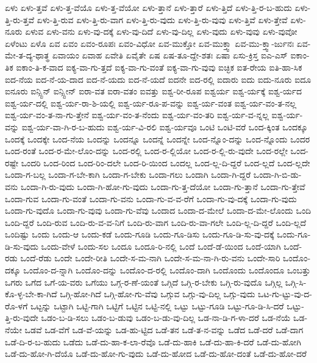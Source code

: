 {ಏಳು
ಏಳು-ತ್ತವೆ
ಏಳು-ತ್ತ-ವೆಯೊ
ಏಳು-ತ್ತ-ವೆಯೋ
ಏಳು-ತ್ತಾನೆ
ಏಳು-ತ್ತಾರೆ
ಏಳು-ತ್ತಿದೆ
ಏಳು-ತ್ತಿ-ರ-ಬ-ಹುದು
ಏಳು-ತ್ತಿ-ರು-ತ್ತವೆ
ಏಳು-ತ್ತಿ-ರುವ
ಏಳು-ತ್ತಿ-ರು-ವಾಗ
ಏಳು-ತ್ತಿ-ರು-ವುದು
ಏಳು-ತ್ತಿ-ರು-ವುವು
ಏಳು-ತ್ತಿವೆ
ಏಳು-ತ್ತೇವೆ
ಏಳು-ನೂರು
ಏಳುವ
ಏಳು-ವನು
ಏಳು-ವು-ದಕ್ಕೆ
ಏಳು-ವು-ದಿದೆ
ಏಳು-ವು-ದಿಲ್ಲ
ಏಳು-ವುದು
ಏಳು-ವುವು
ಏಳು-ವುವೋ
ಏಳೆಂಟು
ಏಳೊ
ಏವ
ಏವಂ
ಏವಂ-ರೂಪಃ
ಏವಂ-ವಿಧೋ
ಏವ-ಮುಕ್ತೋ
ಏವ-ಮುಕ್ತ್ವಾ
ಏವ-ಮು-ಕ್ತ್ವಾ-ರ್ಜುನಃ
ಏವ-ಮೇ-ತ-ದ್ಯ-ಥಾತ್ಥ
ಏವಾಯಂ
ಏವಾಹ
ಏವೇತಿ
ಏವೈತೇ
ಏಷ
ಏಷ-ತೂ-ದ್ದೇ-ಶತಃ
ಏಷಾ
ಏಸು-ಕ್ರಿಸ್ತ
ಐಎ-ಎಸ್
ಐಕಾಂ-ತಿಕ
ಐಕಾಂ-ತಿ-ಕ-ವಾದ
ಐಕ್ಯ-ವಾ-ಗು-ತ್ತದೆ
ಐಕ್ಯ-ವಾ-ಗು-ವಂತೆ
ಐಕ್ಯ-ವಾ-ಗು-ವುವು
ಐಚ್ಛಿಕ
ಐತ-ರೇಯ
ಐತಿ-ಹಾ-ಸಿಕ
ಐದ-ನೆಯ
ಐದ-ನೆ-ಯ-ದಾದ
ಐದ-ನೆ-ಯದು
ಐದ-ನೆ-ಯದೆ
ಐದನೇ
ಐದ-ರಲ್ಲಿ
ಐದಾರು
ಐದು
ಐದು-ನೂರು
ಐದೂ
ಐನೂರು
ಐನ್ಸ್ಟಿನ್
ಐನ್ಸ್ಟೀನ್
ಐರಾ-ವತ
ಐರಾ-ವತಂ
ಐವತ್ತು
ಐಶ್ವ-ರೀ-ರೂಪ
ಐಶ್ವರ್ಯ
ಐಶ್ವ-ರ್ಯಕ್ಕೆ
ಐಶ್ವ-ರ್ಯದ
ಐಶ್ವ-ರ್ಯ-ದಲ್ಲಿ
ಐಶ್ವ-ರ್ಯ-ರಾ-ಶಿ-ಯಲ್ಲಿ
ಐಶ್ವ-ರ್ಯ-ರೂ-ಪ-ವನ್ನು
ಐಶ್ವ-ರ್ಯ-ವಂತ
ಐಶ್ವ-ರ್ಯ-ವಂ-ತ-ನಲ್ಲ
ಐಶ್ವ-ರ್ಯ-ವಂ-ತ-ನಾ-ಗು-ತ್ತೇನೆ
ಐಶ್ವ-ರ್ಯ-ವಂ-ತ-ನೆಂದು
ಐಶ್ವ-ರ್ಯ-ವಂ-ತರಿ
ಐಶ್ವ-ರ್ಯ-ವ-ನ್ನಲ್ಲ
ಐಶ್ವ-ರ್ಯ-ವನ್ನು
ಐಶ್ವ-ರ್ಯ-ವಾ-ಗಿ-ರ-ಬ-ಹುದು
ಐಶ್ವ-ರ್ಯ-ವಿ-ರಲಿ
ಐಶ್ವ-ರ್ಯವೂ
ಒಂಟಿ
ಒಂಟಿ-ವರೆ
ಒಂದ-ಕ್ಕಿಂತ
ಒಂದಕ್ಕೂ
ಒಂದಕ್ಕೆ
ಒಂದಕ್ಕೇ
ಒಂದ-ನೆಯ
ಒಂದನ್ನು
ಒಂದನ್ನೂ
ಒಂದನ್ನೆ
ಒಂದನ್ನೇ
ಒಂದ-ನ್ನೊಂ-ದನ್ನು
ಒಂದ-ನ್ನೊಂದು
ಒಂದರ
ಒಂದ-ರಂತೆ
ಒಂದ-ರ-ಮೇ-ಲೊಂ-ದನ್ನು
ಒಂದ-ರಲ್ಲಿ
ಒಂದ-ರ-ಲ್ಲಿಯೋ
ಒಂದ-ರ-ಲ್ಲಿ-ರು-ವುದೇ
ಒಂದ-ರಲ್ಲೇ
ಒಂದ-ರಷ್ಟೇ
ಒಂದರಿ
ಒಂದ-ರಿಂದ
ಒಂದ-ರಿಂ-ದಲೇ
ಒಂದ-ರಿ-ಯಿಂದ
ಒಂದಲ್ಲ
ಒಂದ-ಲ್ಲ-ದಿ-ದ್ದರೆ
ಒಂದ-ಲ್ಲದೆ
ಒಂದ-ಲ್ಲದೇ
ಒಂದಾ-ಗ-ಬಲ್ಲ
ಒಂದಾ-ಗ-ಬೇ-ಕಾಗಿ
ಒಂದಾ-ಗ-ಬೇಕು
ಒಂದಾ-ಗಲು
ಒಂದಾಗಿ
ಒಂದಾ-ಗಿ-ದ್ದರೆ
ಒಂದಾ-ಗಿ-ಬಿ-ಡು-ವನು
ಒಂದಾ-ಗಿ-ರು-ವುದು
ಒಂದಾ-ಗಿ-ಹೋ-ಗು-ವುದು
ಒಂದಾ-ಗು-ತ್ತ-ದೆಯೋ
ಒಂದಾ-ಗು-ತ್ತಾನೆ
ಒಂದಾ-ಗು-ತ್ತೇವೆ
ಒಂದಾ-ಗುವ
ಒಂದಾ-ಗು-ವಂತೆ
ಒಂದಾ-ಗು-ವನು
ಒಂದಾ-ಗು-ವ-ವ-ರೆಗೆ
ಒಂದಾ-ಗು-ವು-ದಕ್ಕೆ
ಒಂದಾ-ಗು-ವುದು
ಒಂದಾ-ಗು-ವುದೊ
ಒಂದಾ-ಗು-ವುವು
ಒಂದಾ-ಗು-ವೆವು
ಒಂದಾದ
ಒಂದಾ-ದ-ಮೇಲೆ
ಒಂದಾ-ದ-ಮೇ-ಲೊಂದು
ಒಂದಿ
ಒಂದಿ-ದ್ದರೆ
ಒಂದಿ-ರುವ
ಒಂದಿ-ರು-ವ-ವ-ನಿಗೆ
ಒಂದಿ-ರು-ವಾಗ
ಒಂದಿ-ರು-ವಾ-ಗಲೇ
ಒಂದಿ-ಲ್ಲ-ದಿ-ದ್ದರೆ
ಒಂದಿ-ಲ್ಲದೆ
ಒಂದಿಷ್ಟು
ಒಂದು
ಒಂದು-ಆ
ಒಂದು-ಕಡೆ
ಒಂದು-ಗೂಡಿ
ಒಂದು-ಗೂ-ಡಿಸು
ಒಂದು-ಗೂ-ಡಿ-ಸು-ವು-ದಕ್ಕೆ
ಒಂದು-ಗೂ-ಡಿ-ಸು-ವುದು
ಒಂದು-ವೇಳೆ
ಒಂದು-ಸಲ
ಒಂದೂ
ಒಂದೂ-ರಿ-ನಲ್ಲಿ
ಒಂದೆ
ಒಂದೆ-ಡೆ-ಯಿಂದ
ಒಂದೆ-ಯಾಗಿ
ಒಂದೆ-ರಡು
ಒಂದೆ-ರೆಡು
ಒಂದೇ
ಒಂದೇ-ರೀತಿ
ಒಂದೇ-ಸ-ಮ-ನಾಗಿ
ಒಂದೇ-ಸ-ಮ-ನಾ-ಗಿ-ರು-ವನು
ಒಂದೇ-ಸಾರಿ
ಒಂದೊಂ-ದಕ್ಕೂ
ಒಂದೊಂ-ದ-ನ್ನಾಗಿ
ಒಂದೊಂ-ದನ್ನು
ಒಂದೊಂ-ದ-ರಲ್ಲಿ
ಒಂದೊಂ-ದಾಗಿ
ಒಂದೊಂದು
ಒಂದೊಂದೂ
ಒಂಬತ್ತು
ಒಗರು
ಒಗೆದ
ಒಗೆ-ಯ-ವರು
ಒಗೆಯು
ಒಗ್ಗ-ರ-ಣೆ-ಯಂತೆ
ಒಗ್ಗಿದೆ
ಒಗ್ಗಿ-ರ-ಬೇಕು
ಒಗ್ಗಿ-ರು-ವುದೊ
ಒಗ್ಗಿಲ್ಲ
ಒಗ್ಗಿ-ಸಿ-ಕೊ-ಳ್ಳ-ಬೇ-ಕಾ-ಗಿದೆ
ಒಗ್ಗಿ-ಹೋ-ಗಿದೆ
ಒಗ್ಗಿ-ಹೋ-ಗು-ವೆವು
ಒಗ್ಗುವ
ಒಗ್ಗು-ವು-ದಿಲ್ಲ
ಒಗ್ಗು-ವುದು
ಒಟ-ಗು-ಟ್ಟು-ವು-ದ-ರೊ-ಳಗೆ
ಒಟ್ಟನ್ನು
ಒಟ್ಟಾಗಿ
ಒಟ್ಟಿ-ಗಾಗಿ
ಒಟ್ಟಿಗೆ
ಒಟ್ಟಿನ
ಒಟ್ಟಿ-ನಲ್ಲಿ
ಒಟ್ಟು
ಒಟ್ಟು-ಗೂಡಿ
ಒಟ್ಟು-ಗೂ-ಡಿ-ಸಿ-ದರೆ
ಒಟ್ಟು-ತ್ತಿ-ರು-ವುದೇ
ಒಡಂ-ಬ-ಡಿ-ಸಲು
ಒಡಂ-ಬ-ಡುವು
ಒಡಂ-ಬ-ಡು-ವು-ದಿಲ್ಲ
ಒಡ-ನಾ-ಡಿ-ಗ-ಳಾ-ದರೆ
ಒಡ-ನೆಯೆ
ಒಡ-ನೆಯೇ
ಒಡವೆ
ಒಡ-ವೆಗೆ
ಒಡ-ವೆ-ಯನ್ನು
ಒಡ-ಹು-ಟ್ಟಿದ
ಒಡೆ-ತನ
ಒಡೆ-ತ-ನ-ವನ್ನು
ಒಡೆದ
ಒಡೆ-ದರೆ
ಒಡೆ-ದಾಗ
ಒಡೆ-ದಿ-ರ-ಬ-ಹುದು
ಒಡೆದು
ಒಡೆ-ದು-ಹಾ-ಕ-ಲಾ-ರೆವೊ
ಒಡೆ-ದು-ಹಾಕಿ
ಒಡೆ-ದು-ಹಾ-ಕಿ-ದರೆ
ಒಡೆ-ದು-ಹೋಗಿ
ಒಡೆ-ದು-ಹೋ-ಗಿ-ದೆಯೊ
ಒಡೆ-ದು-ಹೋ-ಗು-ವುದು
ಒಡೆ-ದು-ಹೋದ
ಒಡೆ-ದು-ಹೋ-ದಂತೆ
ಒಡೆ-ದು-ಹೋ-ದರೆ
}
